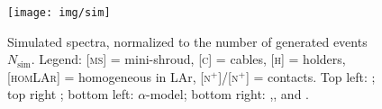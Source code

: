 \begin{landscape}
\begin{figure}
	\texttt{[image: img/sim]}
	\caption{Simulated spectra, normalized to the number of generated events $N_\text{sim}$. Legend: \textsc{[ms]} = mini-shroud, \textsc{[c]} = cables, \textsc{[h]} = holders, \textsc{[homLAr]} = homogeneous in LAr, \textsc{[n$^+$]}/\textsc{[n$^+$]} = contacts. Top left: ; top right ; bottom left: $\alpha$-model; bottom right: ,, and .}
	\label{fig:simspectra}
\end{figure}
\end{landscape}
